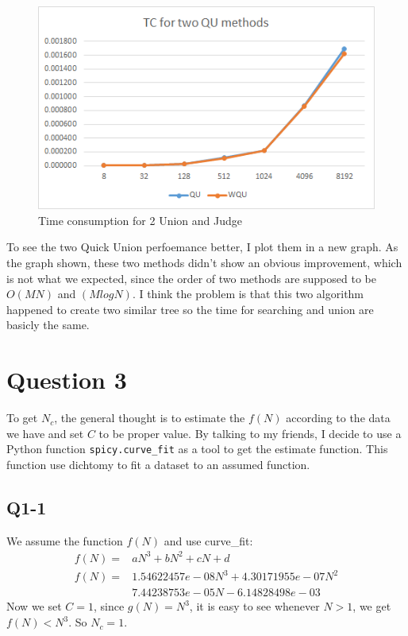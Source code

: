 \documentclass[conference]{IEEEtran}
\begin{document}
\begin{figure}[H]
    \centerline{\includegraphics[scale=0.5]{Pic/fig3.png}}
    \caption{Time consumption for 2 Union and Judge}
\end{figure}

To see the two Quick Union perfoemance better, I plot them in a new graph. As the
graph shown, these two methods didn't show an obvious improvement, which is not 
what we expected, since the order of two methods are supposed to be $O(MN)$ and 
$(MlogN)$. I think the problem is that this two algorithm happened to create two similar tree
so the time for searching and union are basicly the same.

\section*{Question 3}
To get $N_c$, the general thought is to estimate the $f(N)$ according to the 
data we have and set $C$ to be proper value. By talking to my friends,  I decide 
to use a Python function \verb|spicy.curve_fit| as a tool to get the estimate function.
This function use dichtomy to fit a dataset to an assumed function.
\subsection*{Q1-1}
We assume the function $f(N)$ and use curve\_fit:
\[\begin{aligned}
    f(N)=&aN^3+bN^2+cN+d\\
    f(N)=&1.54622457e-08N^3+4.30171955e-07N^2\\
    &7.44238753e-05N-6.14828498e-03
\end{aligned}\]
Now we set $C=1$, since $g(N)=N^3$, it is easy to see whenever $N>1$, we get $f(N)<N^3$. So $N_c=1$.
\end{document}
